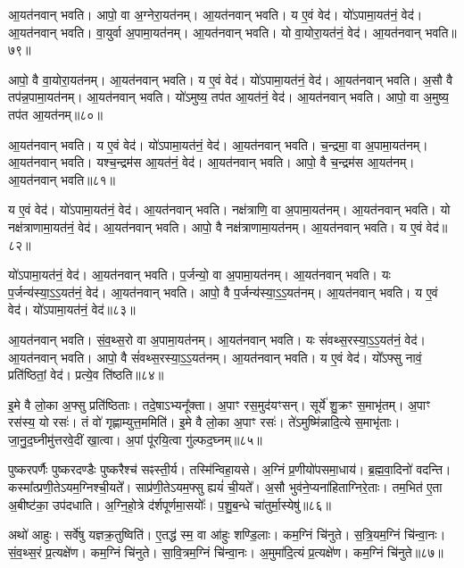 आ॒यत॑नवान्‌ भवति। आपो॒ वा अ॒ग्नेरा॒यत॑नम्। 
आ॒यत॑नवान्‌ भवति। य ए॒वं वेद॑। 
यो॑ऽपामा॒यत॑नं॒ वेद॑। आ॒यत॑नवान्‌ भवति। 
वा॒युर्वा अ॒पामा॒यत॑नम्। आ॒यत॑नवान्‌ भवति। 
यो वा॒योरा॒यत॑नं॒ वेद॑। आ॒यत॑नवान्‌ भवति॥७९॥


आपो॒ वै वा॒योरा॒यत॑नम्। आ॒यत॑नवान्‌ भवति। 
य ए॒वं वेद॑। यो॑ऽपामा॒यत॑नं॒ वेद॑। 
आ॒यत॑नवान्‌ भवति। अ॒सौ वै तप॑न्न॒पामा॒यत॑नम्। 
आ॒यत॑नवान्‌ भवति। यो॑ऽमुष्य॒ तप॑त आ॒यत॑नं॒ वेद॑। 
आ॒यत॑नवान्‌ भवति। आपो॒ वा अ॒मुष्य॒ तप॑त आ॒यत॑नम्॥८०॥


आ॒यत॑नवान्‌ भवति। य ए॒वं वेद॑। 
यो॑ऽपामा॒यत॑नं॒ वेद॑। आ॒यत॑नवान्‌ भवति। 
च॒न्द्रमा॒ वा अ॒पामा॒यत॑नम्। आ॒यत॑नवान्‌ भवति। 
यश्च॒न्द्रम॑स आ॒यत॑नं॒ वेद॑। आ॒यत॑नवान्‌ भवति। 
आपो॒ वै च॒न्द्रम॑स आ॒यत॑नम्। आ॒यत॑नवान्‌ भवति॥८१॥


य ए॒वं वेद॑। यो॑ऽपामा॒यत॑नं॒ वेद॑। 
आ॒यत॑नवान्‌ भवति। नक्ष॑त्राणि॒ वा अ॒पामा॒यत॑नम्। 
आ॒यत॑नवान्‌ भवति। यो नक्ष॑त्राणामा॒यत॑नं॒ वेद॑। 
आ॒यत॑नवान्‌ भवति। आपो॒ वै नक्ष॑त्राणामा॒यत॑नम्। 
आ॒यत॑नवान्‌ भवति। य ए॒वं वेद॑॥८२॥


यो॑ऽपामा॒यत॑नं॒ वेद॑। आ॒यत॑नवान्‌ भवति।
प॒र्जन्यो॒ वा अ॒पामा॒यत॑नम्। आ॒यत॑नवान्‌ भवति। 
यः प॒र्जन्य॑स्या॒ऽ॒ऽ॒यत॑नं॒ वेद॑। आ॒यत॑नवान्‌ भवति। 
आपो॒ वै प॒र्जन्य॑स्या॒ऽ॒ऽ॒यत॑नम्। आ॒यत॑नवान्‌ भवति। 
य ए॒वं वेद॑। यो॑ऽपामा॒यत॑नं॒ वेद॑॥८३॥


आ॒यत॑नवान्‌ भवति। सं॒व॒थ्स॒रो वा अ॒पामा॒यत॑नम्। 
आ॒यत॑नवान्‌ भवति। यः सं॑वथ्स॒रस्या॒ऽ॒ऽ॒यत॑नं॒ वेद॑। 
आ॒यत॑नवान्‌ भवति। आपो॒ वै सं॑वथ्स॒रस्या॒ऽ॒ऽ॒यत॑नम्। 
आ॒यत॑नवान्‌ भवति। य ए॒वं वेद॑। 
यो᳚ऽफ्सु नावं॒ प्रति॑ष्ठितां॒ वेद॑। प्रत्ये॒व ति॑ष्ठति॥८४॥


इ॒मे वै लो॒का अ॒फ्सु प्रति॑ष्ठिताः। तदे॒षाऽभ्यनू᳚क्ता। 
अ॒पाꣳ रस॒मुद॑यꣳसन्। सूर्ये॑ शु॒क्रꣳ स॒माभृ॑तम्। 
अ॒पाꣳ रस॑स्य॒ यो रसः॑। तं वो॑ गृह्णाम्युत्त॒ममिति॑। 
इ॒मे वै लो॒का अ॒पाꣳ रसः॑। ते॑ऽमुष्मि॑न्नादि॒त्ये स॒माभृ॑ताः। 
जा॒नु॒द॒घ्नीमु॑त्तर\-वे॒दीं खा॒त्वा। अ॒पां पू॑रयि॒त्वा गु॑ल्फद॒घ्नम्॥८५॥


पुष्करपर्णैः पुष्करदण्डैः पुष्करैश्च॑ सꣴस्ती॒र्य। तस्मि॑न्वि\-हा॒यसे। 
अ॒ग्निं प्र॒णीयो॑पसमा॒धाय॑। ब्र॒ह्म॒वा॒दिनो॑ वदन्ति। 
कस्मा᳚त्प्रणी॒ते\-ऽयम॒ग्निश्ची॒यते᳚। साप्र॑णी॒तेऽयम॒फ्सु ह्ययं॑ ची॒यते᳚। 
अ॒सौ भुव॑ने॒प्यना॑हिताग्निरे॒ताः। तम॒भित॑ ए॒ता अ॒बीष्ट॑का॒ उप॑दधाति। 
अ॒ग्नि॒हो॒त्रे द॑र्शपूर्णमा॒सयोः᳚। प॒शु॒ब॒न्धे चा॑तुर्मा॒स्येषु॑॥८६॥


अथो॑ आहुः। सर्वे॑षु यज्ञक्र॒तुष्विति॑। 
ए॒तद्ध॑ स्म॒ वा आ॑हुः शण्डि॒लाः। कम॒ग्निं चि॑नुते। 
स॒त्रि॒यम॒ग्निं चि॑न्वा॒नः। सं॒व॒थ्स॒रं प्र॒त्यक्षे॑ण। 
कम॒ग्निं चि॑नुते। सा॒वि॒त्रम॒ग्निं चि॑न्वा॒नः। 
अ॒मुमा॑दि॒त्यं प्र॒त्यक्षे॑ण। कम॒ग्निं चि॑नुते॥८७॥


